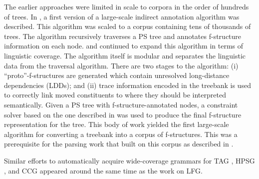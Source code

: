 \documentclass[output=paper,hidelinks]{langscibook}
\begin{document}
The earlier approaches were limited in scale to corpora in the order of hundreds of trees. In \citet{Cahill02automatic}, a first version of a large-scale indirect annotation algorithm was described. This algorithm was scaled to a corpus containing tens of thousands of trees. The algorithm recursively traverses a PS tree and annotates f-structure information on each node. \citet{Mairead} and \citet{Mick} continued to expand this algorithm in terms of linguistic coverage. The algorithm itself is modular and separates the linguistic data from the traversal algorithm. There are two stages to the algorithm: (i)  ``proto''-f-structures are generated which contain unresolved long-distance dependencies (LDDs); and (ii)  trace information encoded in the treebank is used to correctly link moved constituents to where they should be interpreted semantically. Given a PS tree with f-structure-annotated nodes, a constraint solver based on the one described in \citet{gazdarMellish} was used to produce the final f-structure representation for the tree.  This body of work yielded the first large-scale algorithm for converting a treebank into a corpus of f-structures. This was a prerequisite for the parsing work that built on this corpus as described in . 

Similar efforts to automatically acquire wide-coverage grammars for TAG \citep{xia1999extracting}, HPSG \citep{miyao2003probabilistic}, and CCG \citep{hockenmaier-steedman-2002-generative} appeared around the same time as the work on LFG. 

\end{document}
